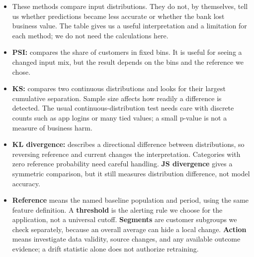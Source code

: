 \documentclass[11pt,a4paper]{article}
\begin{document}
\begin{examplebox}[title after break={SPOKEN SCRIPT --- slide 22 continued}]
\begin{itemize}
\item These methods compare input distributions. They do not, by themselves, tell us whether predictions became less accurate or whether the bank lost business value. The table gives us a useful interpretation and a limitation for each method; we do not need the calculations here.
\item \textbf{PSI:} compares the share of customers in fixed bins. It is useful for seeing a changed input mix, but the result depends on the bins and the reference we chose.
\item \textbf{KS:} compares two continuous distributions and looks for their largest cumulative separation. Sample size affects how readily a difference is detected. The usual continuous-distribution test needs care with discrete counts such as app logins or many tied values; a small p-value is not a measure of business harm.
\item \textbf{KL divergence:} describes a directional difference between distributions, so reversing reference and current changes the interpretation. Categories with zero reference probability need careful handling. \textbf{JS divergence} gives a symmetric comparison, but it still measures distribution difference, not model accuracy.
\item \textbf{Reference} means the named baseline population and period, using the same feature definition. A \textbf{threshold} is the alerting rule we choose for the application, not a universal cutoff. \textbf{Segments} are customer subgroups we check separately, because an overall average can hide a local change. \textbf{Action} means investigate data validity, source changes, and any available outcome evidence; a drift statistic alone does not authorize retraining.
\end{itemize}
\end{examplebox}
\par\noindent{\scriptsize\textcolor{teal!60!black}{Reading anchor: Bass, Ch. 11 / §14.1.5}}
\clearpage
\end{document}
